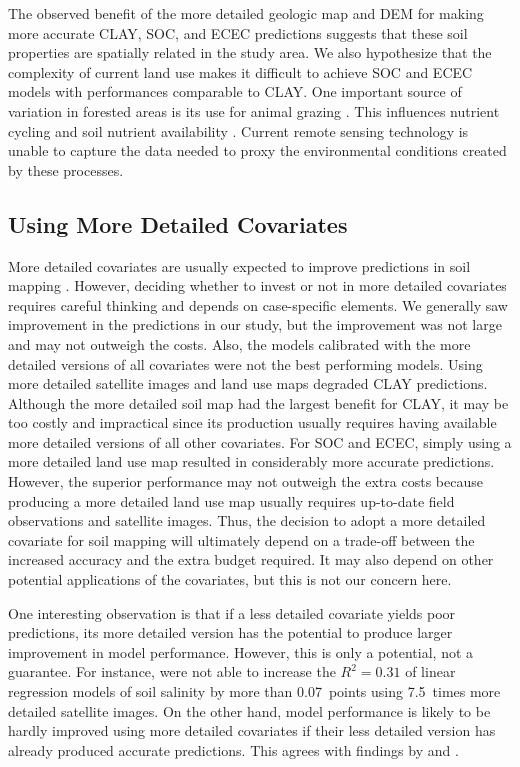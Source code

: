 The observed benefit of the more detailed geologic map and DEM for making more accurate CLAY, SOC, and ECEC 
predictions suggests that these soil properties are spatially related in the study area. We also hypothesize 
that the complexity of current land use makes it difficult to achieve SOC and ECEC models with performances 
comparable to CLAY. One important source of variation in forested areas is its use for animal grazing 
\cite{SamuelRosaEtAl2011a}. This influences nutrient cycling and soil nutrient availability 
\cite{SchramaEtAl2013}. Current remote sensing technology is unable to capture the data needed to proxy the 
environmental conditions created by these processes.

\subsection{Using More Detailed Covariates}

More detailed covariates are usually expected to improve predictions in soil mapping \cite{CavazziEtAl2013, 
MaynardEtAl2014}. However, deciding whether to invest or not in more detailed covariates requires careful 
thinking and depends on case-specific elements. We generally saw improvement in the predictions in our study, 
but the improvement was not large and may not outweigh the costs. Also, the models calibrated with the more 
detailed versions of all covariates were not the best performing models. Using more detailed satellite images 
and land use maps degraded CLAY predictions. Although the more detailed soil map had the largest benefit for 
CLAY, it may be too costly and impractical since its production usually requires having available more detailed 
versions of all other covariates. For SOC and ECEC, simply using a more detailed land use map resulted in 
considerably more accurate predictions. However, the superior performance may not outweigh the extra costs 
because producing a more detailed land use map usually requires up-to-date field observations and satellite 
images. Thus, the decision to adopt a more detailed covariate for soil mapping will ultimately depend on a 
trade-off between the increased accuracy and the extra budget required. It may also depend on other potential 
applications of the covariates, but this is not our concern here.

One interesting observation is that if a less detailed covariate yields poor predictions, its more detailed 
version has the potential to produce larger improvement in model performance. However, this is only a 
potential, not a guarantee. For instance,  were not able to increase the $R^2 = 
0.31$ of linear regression models of soil salinity by more than \num{0.07}~points using \num{7.5}~times more 
detailed satellite images. On the other hand, model performance is likely to be hardly improved using more 
detailed covariates if their less detailed version has already produced accurate predictions. This agrees with 
findings by  and .


